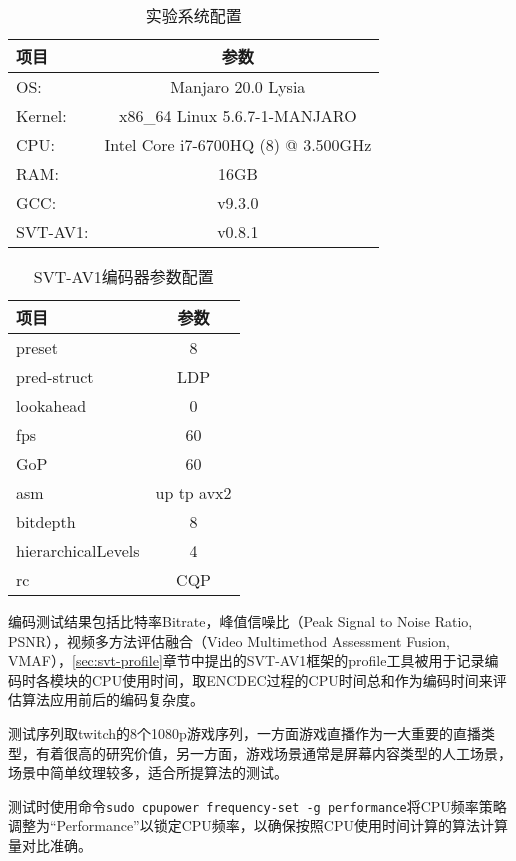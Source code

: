   \begin{table}[htbp]
		\renewcommand{\arraystretch}{0.9}
		\caption{实验系统配置}
		\label{tab:os}
		\centering
		\begin{tabular}{lc} \toprule
			项目& 参数  \\ \midrule
			OS:     &Manjaro 20.0 Lysia\\
			Kernel: & x86\_64 Linux 5.6.7-1-MANJARO\\
			CPU:    &Intel Core i7-6700HQ (8) @ 3.500GHz\\
			RAM:    &16GB\\
			GCC:    &v9.3.0\\
			SVT-AV1: & v0.8.1\\ \bottomrule
		\end{tabular}
	\end{table}
  \begin{table}[htbp]
		\renewcommand{\arraystretch}{0.9}
		\caption{SVT-AV1编码器参数配置}
		\label{tab:svt}
		\centering
		\begin{tabular}{lc} \toprule
			项目& 参数  \\ \midrule
			preset     &8\\
			pred-struct& LDP\\
			lookahead    &0\\
			fps    &60\\
			GoP    &60\\
			asm    & up tp avx2\\
			bitdepth & 8\\
			hierarchicalLevels  & 4 \\
			rc & CQP\\ \bottomrule
		\end{tabular}
	\end{table}
  编码测试结果包括比特率Bitrate，峰值信噪比（Peak Signal to Noise Ratio, PSNR），视频多方法评估融合（Video Multimethod Assessment Fusion, VMAF\cite{liPracticalPerceptualVideo}），\ref{sec:svt-profile}章节中提出的SVT-AV1框架的profile工具被用于记录编码时各模块的CPU使用时间，取ENCDEC过程的CPU时间总和作为编码时间来评估算法应用前后的编码复杂度。

  测试序列取twitch的8个1080p游戏序列，一方面游戏直播作为一大重要的直播类型，有着很高的研究价值，另一方面，游戏场景通常是屏幕内容类型的人工场景，场景中简单纹理较多，适合所提算法的测试。

  测试时使用命令\texttt{sudo cpupower frequency-set -g performance}将CPU频率策略调整为“Performance”以锁定CPU频率，以确保按照CPU使用时间计算的算法计算量对比准确。





